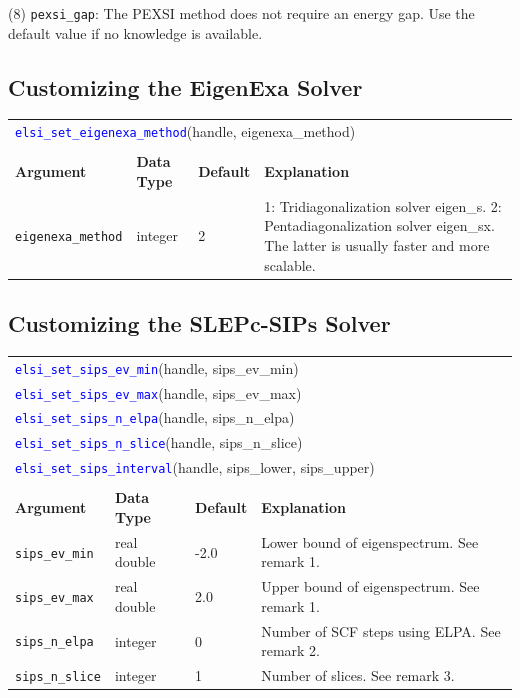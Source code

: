 \documentclass{report}
\newcommand{\api}[1]{\textcolor{blue}{\texttt{#1}}}
\begin{document}
(8) \texttt{pexsi\_gap}: The PEXSI method does not require an energy gap. Use the default value if no knowledge is available.

\subsection{Customizing the EigenExa Solver}
\label{subsec:setter_eigenexa}
\begin{tabular}[]{|p{30mm}|p{20mm}|p{15mm}|p{97mm}|}
\multicolumn{4}{l}{\api{elsi\_set\_eigenexa\_method}(handle, eigenexa\_method)}\\
\multicolumn{4}{l}{}\\
\hline
\multicolumn{1}{|l|}{\textbf{Argument}} & \multicolumn{1}{l|}{\textbf{Data Type}} & \multicolumn{1}{l|}{\textbf{Default}} & \multicolumn{1}{l|}{\textbf{Explanation}}\\
\hline
\texttt{eigenexa\_method} & integer & 2 & 1: Tridiagonalization solver eigen\_s. 2: Pentadiagonalization solver eigen\_sx. The latter is usually faster and more scalable.\\
\hline
\end{tabular}

\subsection{Customizing the SLEPc-SIPs Solver}
\label{subsec:setter_sips}
\begin{tabular}[]{|p{30mm}|p{20mm}|p{15mm}|p{97mm}|}
\multicolumn{4}{l}{\api{elsi\_set\_sips\_ev\_min}(handle, sips\_ev\_min)}\\
\multicolumn{4}{l}{\api{elsi\_set\_sips\_ev\_max}(handle, sips\_ev\_max)}\\
\multicolumn{4}{l}{\api{elsi\_set\_sips\_n\_elpa}(handle, sips\_n\_elpa)}\\
\multicolumn{4}{l}{\api{elsi\_set\_sips\_n\_slice}(handle, sips\_n\_slice)}\\
\multicolumn{4}{l}{\api{elsi\_set\_sips\_interval}(handle, sips\_lower, sips\_upper)}\\
\multicolumn{4}{l}{}\\
\hline
\multicolumn{1}{|l|}{\textbf{Argument}} & \multicolumn{1}{l|}{\textbf{Data Type}} & \multicolumn{1}{l|}{\textbf{Default}} & \multicolumn{1}{l|}{\textbf{Explanation}}\\
\hline
\texttt{sips\_ev\_min}  & real double & -2.0 & Lower bound of eigenspectrum. See remark 1.\\
\hline
\texttt{sips\_ev\_max}  & real double & 2.0  & Upper bound of eigenspectrum. See remark 1.\\
\hline
\texttt{sips\_n\_elpa}  & integer     & 0    & Number of SCF steps using ELPA. See remark 2.\\
\hline
\texttt{sips\_n\_slice} & integer     & 1    & Number of slices. See remark 3.\\
\hline
\end{tabular}
\end{document}
